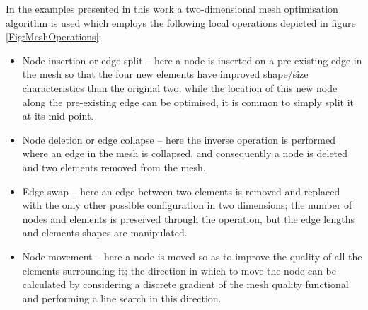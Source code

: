 In the examples presented in this work a two-dimensional mesh
optimisation algorithm \citep{agouzal1999,vasilevskii1999adaptive} is used
which employs the following local operations depicted in figure
\ref{Fig:MeshOperations}:
\begin{itemize}
\item Node insertion or edge split -- here a node is inserted on a
  pre-existing edge in the mesh so that the four new elements have
  improved shape/size characteristics than the original two; while the
  location of this new node along the pre-existing edge can be
  optimised, it is common to simply split it at its mid-point.
\item Node deletion or edge collapse -- here the inverse operation is
  performed where an edge in the mesh is collapsed, and consequently a
  node is deleted and two elements removed from the mesh.
\item Edge swap -- here an edge between two elements is removed and
  replaced with the only other possible configuration in two
  dimensions; the number of nodes and elements is preserved through
  the operation, but the edge lengths and elements shapes are
  manipulated.
\item Node movement -- here a node is moved so as to improve the
  quality of all the elements surrounding it; the direction in which
  to move the node can be calculated by considering a discrete
  gradient of the mesh quality functional and performing a line search
  in this direction.
\end{itemize}

